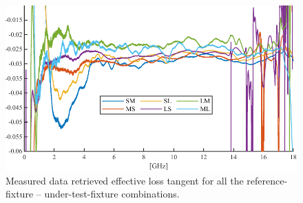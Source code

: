 \documentclass[11pt,a4paper]{article}
\begin{document}
    \begin{figure}[!tb]
        \includegraphics[width=\textwidth]{tandmeas}
        \caption{Measured data retrieved effective loss tangent for all the reference-fixture -- under-test-fixture combinations.}
        \label{fig:tandmeas}
    \end{figure}
\end{document}

